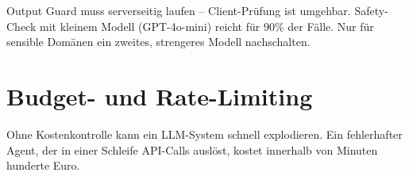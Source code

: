 \begin{praxishinweis}
Output Guard muss serverseitig laufen -- Client-Prüfung ist umgehbar. Safety-Check mit kleinem Modell (GPT-4o-mini) reicht für 90\% der Fälle. Nur für sensible Domänen ein zweites, strengeres Modell nachschalten.
\end{praxishinweis}

\section{Budget- und Rate-Limiting}

Ohne Kostenkontrolle kann ein LLM-System schnell explodieren. Ein fehlerhafter Agent, der in einer Schleife API-Calls auslöst, kostet innerhalb von Minuten hunderte Euro.

